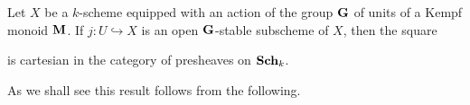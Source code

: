 \begin{theorem}\label{theorem:open_subfunctors_induced_by_open_stable_subschemes}
Let $X$ be a $k$-scheme equipped with an action of the group $\mathbf{G}$ of units of a Kempf monoid $\mathbf{M}$. If $j:U\hookrightarrow X$ is an open $\mathbf{G}$-stable subscheme of $X$, then the square
\begin{center}
\end{center}
is cartesian in the category of presheaves on $\mathbf{Sch}_k$.
\end{theorem}
\noindent
As we shall see this result follows from the following.

